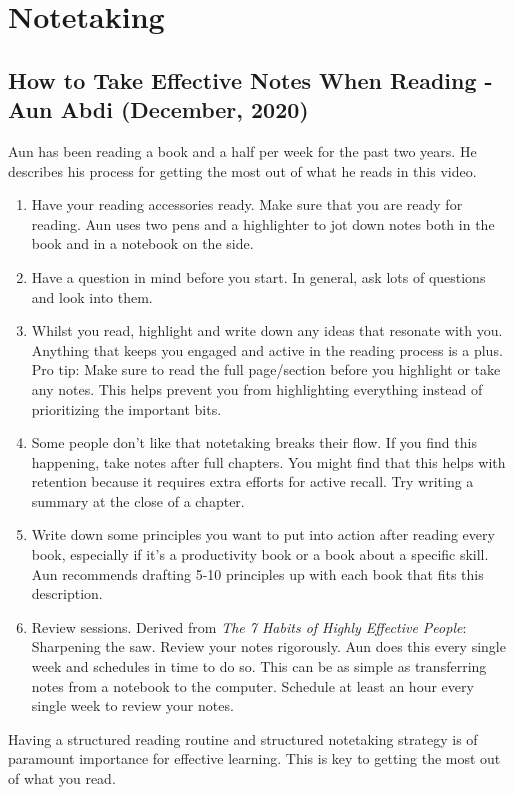 \section{Notetaking}

\subsection{ How to Take Effective Notes When Reading - Aun Abdi (December, 2020) }

Aun has been reading a book and a half per week for the past two years. He describes his process for getting the most out of what he reads in this video. 
\begin{enumerate}
	\item Have your reading accessories ready. Make sure that you are ready for reading. Aun uses two pens and a highlighter to jot down notes both in the book and in a notebook on the side. 
	\item Have a question in mind before you start. In general, ask lots of questions and look into them. 
	\item Whilst you read, highlight and write down any ideas that resonate with you. Anything that keeps you engaged and active in the reading process is a plus. Pro tip: Make sure to read the full page/section before you highlight or take any notes. This helps prevent you from highlighting everything instead of prioritizing the important bits. 
	\item Some people don't like that notetaking breaks their flow. If you find this happening, take notes after full chapters. You might find that this helps with retention because it requires extra efforts for active recall. Try writing a summary at the close of a chapter. 
	\item Write down some principles you want to put into action after reading every book, especially if it's a productivity book or a book about a specific skill. Aun recommends drafting 5-10 principles up with each book that fits this description.
	\item Review sessions. Derived from \emph{The 7 Habits of Highly Effective People}: Sharpening the saw. Review your notes rigorously. Aun does this every single week and schedules in time to do so. This can be as simple as transferring notes from a notebook to the computer. Schedule at least an hour every single week to review your notes. 
\end{enumerate}

Having a structured reading routine and structured notetaking strategy is of paramount importance for effective learning. This is key to getting the most out of what you read. 

